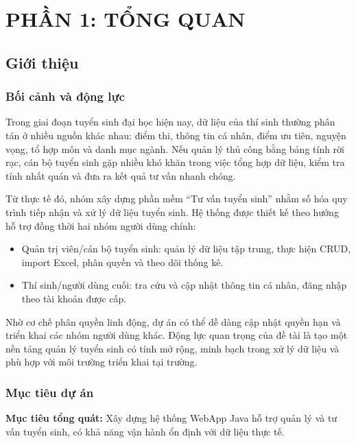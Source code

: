 \documentclass[12pt,a4paper,oneside]{report}
\begin{document}

\tableofcontents
\newpage

\part*{PHẦN 1: TỔNG QUAN}

\chapter{Giới thiệu}
\section{Bối cảnh và động lực}
Trong giai đoạn tuyển sinh đại học hiện nay, dữ liệu của thí sinh thường phân tán ở nhiều nguồn khác nhau: điểm thi, thông tin cá nhân, điểm ưu tiên, nguyện vọng, tổ hợp môn và danh mục ngành. Nếu quản lý thủ công bằng bảng tính rời rạc, cán bộ tuyển sinh gặp nhiều khó khăn trong việc tổng hợp dữ liệu, kiểm tra tính nhất quán và đưa ra kết quả tư vấn nhanh chóng.

Từ thực tế đó, nhóm xây dựng phần mềm ``Tư vấn tuyển sinh'' nhằm số hóa quy trình tiếp nhận và xử lý dữ liệu tuyển sinh. Hệ thống được thiết kế theo hướng hỗ trợ đồng thời hai nhóm người dùng chính:
\begin{itemize}
  \item Quản trị viên/cán bộ tuyển sinh: quản lý dữ liệu tập trung, thực hiện CRUD, import Excel, phân quyền và theo dõi thống kê.
  \item Thí sinh/người dùng cuối: tra cứu và cập nhật thông tin cá nhân, đăng nhập theo tài khoản được cấp.
\end{itemize}

Nhờ cơ chế phân quyền linh động, dự án có thể dễ dàng cập nhật quyền hạn và triển khai các nhóm người dùng khác. Động lực quan trọng của đề tài là tạo một nền tảng quản lý tuyển sinh có tính mở rộng, minh bạch trong xử lý dữ liệu và phù hợp với môi trường triển khai tại trường.

\section{Mục tiêu dự án}
\textbf{Mục tiêu tổng quát:} Xây dựng hệ thống WebApp Java hỗ trợ quản lý và tư vấn tuyển sinh, có khả năng vận hành ổn định với dữ liệu thực tế.
\end{document}

